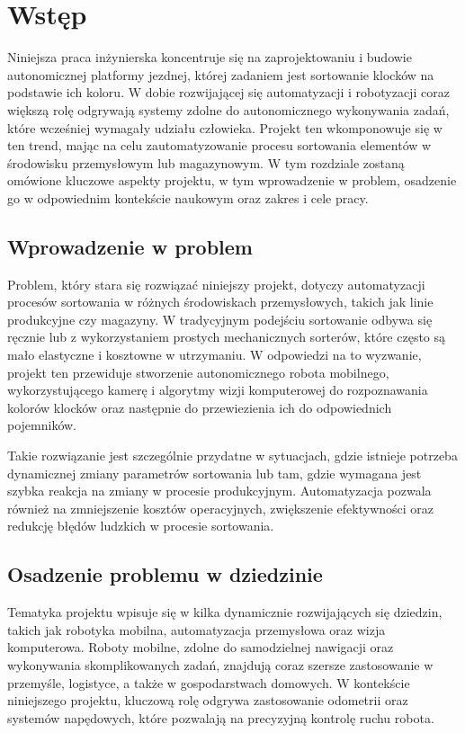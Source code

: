 \chapter{Wstęp}
\label{ch:wstep}

Niniejsza praca inżynierska koncentruje się na zaprojektowaniu i budowie autonomicznej platformy jezdnej, której zadaniem jest sortowanie klocków na podstawie ich koloru. W dobie rozwijającej się automatyzacji i robotyzacji coraz większą rolę odgrywają systemy zdolne do autonomicznego wykonywania zadań, które wcześniej wymagały udziału człowieka. Projekt ten wkomponowuje się w ten trend, mając na celu zautomatyzowanie procesu sortowania elementów w środowisku przemysłowym lub magazynowym. W tym rozdziale zostaną omówione kluczowe aspekty projektu, w tym wprowadzenie w problem, osadzenie go w odpowiednim kontekście naukowym oraz zakres i cele pracy.

\section{Wprowadzenie w problem}
\label{sec:wprowadzenie}

Problem, który stara się rozwiązać niniejszy projekt, dotyczy automatyzacji procesów sortowania w różnych środowiskach przemysłowych, takich jak linie produkcyjne czy magazyny. W tradycyjnym podejściu sortowanie odbywa się ręcznie lub z wykorzystaniem prostych mechanicznych sorterów, które często są mało elastyczne i kosztowne w utrzymaniu. W odpowiedzi na to wyzwanie, projekt ten przewiduje stworzenie autonomicznego robota mobilnego, wykorzystującego kamerę i algorytmy wizji komputerowej do rozpoznawania kolorów klocków oraz następnie do przewiezienia ich do odpowiednich pojemników.

Takie rozwiązanie jest szczególnie przydatne w sytuacjach, gdzie istnieje potrzeba dynamicznej zmiany parametrów sortowania lub tam, gdzie wymagana jest szybka reakcja na zmiany w procesie produkcyjnym. Automatyzacja pozwala również na zmniejszenie kosztów operacyjnych, zwiększenie efektywności oraz redukcję błędów ludzkich w procesie sortowania.

\section{Osadzenie problemu w dziedzinie}
\label{sec:osadzenie}

Tematyka projektu wpisuje się w kilka dynamicznie rozwijających się dziedzin, takich jak robotyka mobilna, automatyzacja przemysłowa oraz wizja komputerowa. Roboty mobilne, zdolne do samodzielnej nawigacji oraz wykonywania skomplikowanych zadań, znajdują coraz szersze zastosowanie w przemyśle, logistyce, a także w gospodarstwach domowych. W kontekście niniejszego projektu, kluczową rolę odgrywa zastosowanie odometrii oraz systemów napędowych, które pozwalają na precyzyjną kontrolę ruchu robota.

